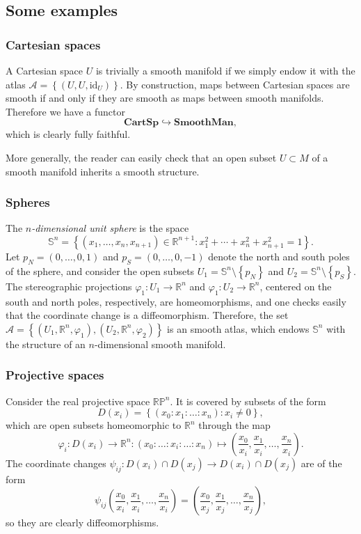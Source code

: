 \documentclass[11pt,a4paper]{book}
\theoremstyle{remark} \newtheorem{rmk}[thm]{Remark}
\theoremstyle{definition} \newtheorem{defn}[thm]{Definition}
\theoremstyle{definition} \newtheorem{ex}[thm]{Example}
\theoremstyle{definition} \newtheorem{ej}[thm]{Exercise}
\begin{document}
\subsection{Some examples}
\subsubsection{Cartesian spaces} A Cartesian space $U$ is trivially a smooth manifold if we simply endow it with the atlas $\mathcal{A}=\left\{ (U,U,\mathrm{id}_{U}) \right\}$. By construction, maps between Cartesian spaces are smooth if and only if they are smooth as maps between smooth manifolds. Therefore we have a functor \[\mathbf{CartSp}\hookrightarrow \mathbf{SmoothMan},\] which is clearly fully faithful.

More generally, the reader can easily check that an open subset $U\subset M$ of a smooth manifold inherits a smooth structure.

\subsubsection{Spheres} The \emph{$n$-dimensional unit sphere} is the space
\begin{equation*}
\mathbb{S}^n=\left\{(x_1,\dots,x_n,x_{n+1}) \in \mathbb{R}^{n+1}: x_1^2+\cdots +x_n^2+x_{n+1}^2=1  \right\}.
\end{equation*}
Let $p_N=(0,\dots,0,1)$ and $p_S=(0,\dots,0,-1)$ denote the north and south poles of the sphere, and consider the open subsets $U_1=\mathbb{S}^n \setminus \left\{ p_N \right\}$ and $U_2=\mathbb{S}^n \setminus \left\{ p_S \right\}$. The stereographic projections $\varphi_1:U_1\rightarrow \mathbb{R}^n$ and $\varphi_1:U_2\rightarrow \mathbb{R}^n$, centered on the south and north poles, respectively, are homeomorphisms, and one checks easily that the coordinate change is a diffeomorphism. Therefore, the set $\mathcal{A}=\left\{ (U_1,\mathbb{R}^n,\varphi_1), (U_2,\mathbb{R}^n,\varphi_2) \right\}$ is an smooth atlas, which endows $\mathbb{S}^n$ with the structure of an $n$-dimensional smooth manifold.

\subsubsection{Projective spaces} Consider the real projective space $\mathbb{RP}^n$. It is covered by subsets of the form
\begin{equation*}
D(x_i)= \left\{ (x_0:x_1:\dots:x_n) : x_i \neq 0 \right\},
\end{equation*}
which are open subsets homeomorphic to $\mathbb{R}^n$ through the map
\begin{equation*}
\varphi_i: D(x_i)\rightarrow \mathbb{R}^n: (x_0:\dots:x_i:\dots:x_n) \mapsto \left(\frac{x_0}{x_i},\frac{x_1}{x_i},\dots,\frac{x_n}{x_i}\right).
\end{equation*}
The coordinate changes $\psi_{ij}:D(x_i)\cap D(x_j) \rightarrow D(x_i)\cap D(x_j)$ are of the form
\begin{equation*}
\psi_{ij}\left(\frac{x_0}{x_i},\frac{x_1}{x_i},\dots,\frac{x_n}{x_i}\right) = \left(\frac{x_0}{x_j},\frac{x_1}{x_j},\dots,\frac{x_n}{x_j}\right),
\end{equation*}
so they are clearly diffeomorphisms.
\end{document}
